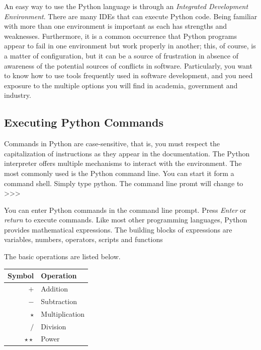 
An easy way to use the Python language is through  an \textit{Integrated Development Environment}. There are many IDEs that can execute Python code. Being familiar with more than one environment is important as each has strengths and weaknesses. Furthermore, it is a common occurrence that Python programs appear to fail in one environment but work properly in another; this, of course, is a matter of configuration, but it can be a source of frustration in absence of awareness of the potential sources of conflicts in software. Particularly, you want to know how to use tools frequently used in software development, and you need exposure to the multiple options you will find in academia, government and industry. 


\subsection{Executing Python Commands}

Commands in Python are case-sensitive, that is, you must respect the capitalization of instructions as they appear in the documentation. The Python interpreter offers multiple mechanisms to interact with the environment. The most commonly used is the Python command line. You can start it form a command shell. Simply type {\s python}. The command line promt will change to {\s >>> }   

You can enter Python commands in the command line prompt. Press \textit{Enter} or \textit{return} to execute commands.  Like most other programming languages, Python provides mathematical expressions. The building blocks of expressions are variables, numbers, operators, scripts and functions

The basic operations are listed below. \vs

\begin{tabular}{r|l}
\hline
Symbol 			& Operation \\
\hline
$+$       	&    Addition \\
$-$       	&    Subtraction \\
$\star$   	&    Multiplication \\
$/$       	&    Division \\
$\star\star$&      Power \\
\hline
\end{tabular}

